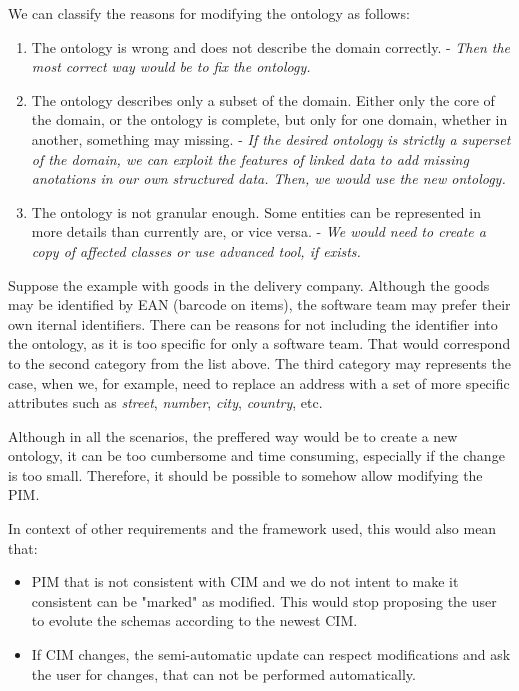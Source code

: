 We can classify the reasons for modifying the ontology as follows:

\begin{enumerate}
    \item The ontology is wrong and does not describe the domain correctly. - \textit{Then the most correct way would be to fix the ontology.}
    \item The ontology describes only a subset of the domain. Either only the core of the domain, or the ontology is complete, but only for one domain, whether in another, something may missing. - \textit{If the desired ontology is strictly a superset of the domain, we can exploit the features of linked data to add missing anotations in our own structured data. Then, we would use the new ontology.}
    \item The ontology is not granular enough. Some entities can be represented in more details than currently are, or vice versa. - \textit{We would need to create a copy of affected classes or use advanced tool, if exists.}
\end{enumerate}

Suppose the example with goods in the delivery company. Although the goods may be identified by EAN (barcode on items), the software team may prefer their own iternal identifiers. There can be reasons for not including the identifier into the ontology, as it is too specific for only a software team. That would correspond to the second category from the list above. The third category may represents the case, when we, for example, need to replace an address with a set of more specific attributes such as \textit{street}, \textit{number}, \textit{city}, \textit{country}, etc.

Although in all the scenarios, the preffered way would be to create a new ontology, it can be too cumbersome and time consuming, especially if the change is too small. Therefore, it should be possible to somehow allow modifying the PIM.

\smallskip

In context of other requirements and the framework used, this would also mean that:
\begin{itemize}
    \item PIM that is not consistent with CIM and we do not intent to make it consistent can be "marked" as modified. This would stop proposing the user to evolute the schemas according to the newest CIM.
    \item If CIM changes, the semi-automatic update can respect modifications and ask the user for changes, that can not be performed automatically.
\end{itemize}

